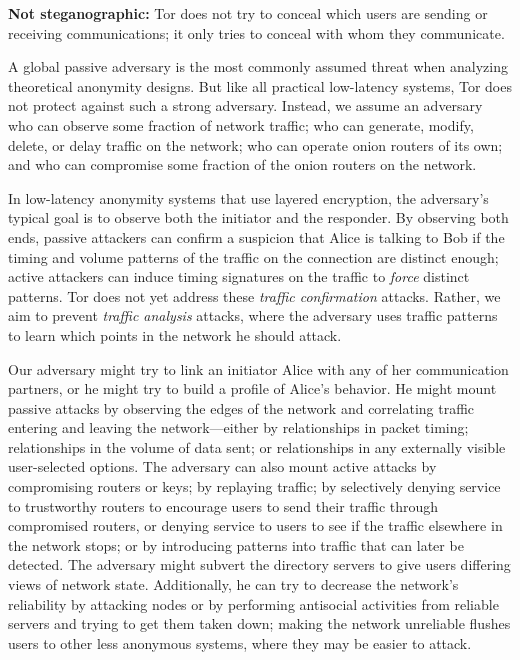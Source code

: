 \documentclass[times,10pt,twocolumn]{article}
\begin{document}
\textbf{Not steganographic:} Tor does not try to conceal which users are
sending or receiving communications; it only tries to conceal with whom
they communicate.

\label{subsec:threat-model}

A global passive adversary is the most commonly assumed threat when
analyzing theoretical anonymity designs. But like all practical
low-latency systems, Tor does not protect against such a strong
adversary. Instead, we assume an adversary who can observe some fraction
of network traffic; who can generate, modify, delete, or delay traffic
on the network; who can operate onion routers of its own; and who can
compromise some fraction of the onion routers on the network.

In low-latency anonymity systems that use layered encryption, the
adversary's typical goal is to observe both the initiator and the
responder. By observing both ends, passive attackers can confirm a
suspicion that Alice is 
talking to Bob if the timing and volume patterns of the traffic on the
connection are distinct enough; active attackers can induce timing
signatures on the traffic to \emph{force} distinct patterns. Tor
does not yet address these \emph{traffic confirmation} attacks.
Rather, we aim to prevent \emph{traffic
analysis} attacks, where the adversary uses traffic patterns to learn
which points in the network he should attack.

Our adversary might try to link an initiator Alice with any of her
communication partners, or he might try to build a profile of Alice's
behavior. He might mount passive attacks by observing the edges of the
network and correlating traffic entering and leaving the network---either
by relationships in packet timing; relationships in the volume
of data sent; or relationships in any externally visible user-selected
options. The adversary can also mount active attacks by compromising
routers or keys; by replaying traffic; by selectively denying service
to trustworthy routers to encourage users to send their traffic through
compromised routers, or denying service to users to see if the traffic
elsewhere in the
network stops; or by introducing patterns into traffic that can later be
detected. The adversary might subvert the directory servers to give users
differing views of network state. Additionally, he can try to decrease
the network's reliability by attacking nodes or by performing antisocial
activities from reliable servers and trying to get them taken down;
making the network unreliable flushes users to other less anonymous
systems, where they may be easier to attack.
\end{document}
